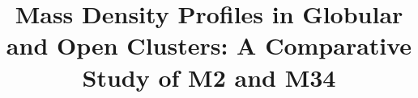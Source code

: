 \documentclass[linenumbers,trackchanges,twocolumn]{aastex701}
\begin{document}
\title{Mass Density Profiles in Globular and Open Clusters: A Comparative Study of M2 and M34}

\end{document}
